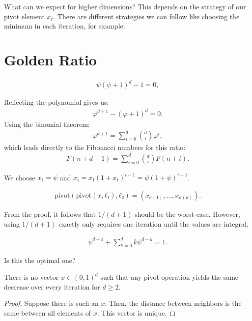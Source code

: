 What can we expect for higher dimensions?
This depends on the strategy of our pivot element $x_\ell$.
There are different strategies we can follow like choosing the minimum in each iteration, for example.

\section{Golden Ratio}

\begin{align*}
  ψ(ψ + 1)^d - 1 = 0,
\end{align*}

Reflecting the polynomial gives us:
\begin{align*}
  φ^{d+1} - (φ + 1)^d = 0.
\end{align*}
Using the binomial theorem:
\begin{align*}
  φ^{d+1} = ∑_{i=0}^d \binom{d}{i} φ^i,
\end{align*}
which leads directly to the Fibonacci numbers for this ratio:
\begin{align*}
  F(n + d + 1) = ∑_{i=0}^d \binom{d}{i} F(n + i).
\end{align*}

We choose $x₁ = ψ$ and $x_i = x₁ (1 + x₁)^{i-1} = ψ (1 + ψ)^{i-1}$.

\begin{align*}
  \text{pivot}(\text{pivot}(x, ℓ₁), ℓ₂) = \left(x_{σ(1)}, \dots, x_{σ(d)}\right).
\end{align*}

From the proof, it follows that $1/(d+1)$ should be the worst-case.
However, using $1/(d+1)$ exactly only requires one iteration until the values are integral.

\begin{align*}
  ψ^{d+1} + ∑_{k=0}^d k ψ^{d-k} = 1.
\end{align*}

Is this the optimal one?

\begin{theorem}
  There is no vector $x ∈ (0, 1)^d$
  such that any pivot operation yields the same decrease
  over every iteration for $d ≥ 2$.
\end{theorem}

\begin{proof}
  Suppose there is such an $x$.
  Then, the distance between neighbors is the same between all elements of $x$.
  This vector is unique.
\end{proof}

